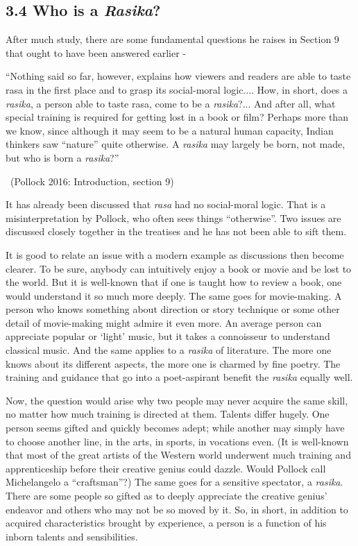 \subsection*{3.4 Who is a \textit{Rasika}?}

After much study, there are some fundamental questions he raises in Section 9 that ought to have been answered earlier -

\begin{myquote}
“Nothing said so far, however, explains how viewers and readers are able to taste rasa in the first place and to grasp its social-moral logic.... How, in short, does a \textit{rasika}, a person able to taste rasa, come to be a \textit{rasika}?... And after all, what special training is required for getting lost in a book or film? Perhaps more than we know, since although it may seem to be a natural human capacity, Indian thinkers saw “nature” quite otherwise. A \textit{rasika} may largely be born, not made, but who is born a \textit{rasika}?” 

~\hfill (Pollock 2016: Introduction, section 9)
\end{myquote}

It has already been discussed that \textit{rasa }had no social-moral logic. That is a misinterpretation by Pollock, who often sees things “otherwise”. Two issues are discussed closely together in the treatises and he has not been able to sift them.

It is good to relate an issue with a modern example as discussions then become clearer. To be sure, anybody can intuitively enjoy a book or movie and be lost to the world. But it is well-known that if one is taught how to review a book, one would understand it so much more deeply. The same goes for movie-making. A person who knows something about direction or story technique or some other detail of movie-making might admire it even more. An average person can appreciate popular or ‘light’ music, but it takes a connoisseur to understand classical music. And the same applies to a \textit{rasika} of literature. The more one knows about its different aspects, the more one is charmed by fine poetry. The training and guidance that go into a poet-aspirant benefit the \textit{rasika} equally well.

Now, the question would arise why two people may never acquire the same skill, no matter how much training is directed at them. Talents differ hugely. One person seems gifted and quickly becomes adept; while another may simply have to choose another line, in the arts, in sports, in vocations even. (It is well-known that most of the great artists of the Western world underwent much training and apprenticeship before their creative genius could dazzle. Would Pollock call Michelangelo a “craftsman”?) The same goes for a sensitive spectator, a \textit{rasika}. There are some people so gifted as to deeply appreciate the creative genius’ endeavor and others who may not be so moved by it. So, in short, in addition to acquired characteristics brought by experience, a person is a function of his inborn talents and sensibilities.


